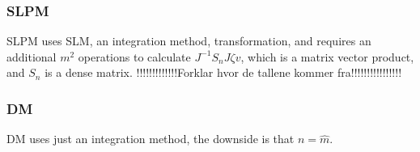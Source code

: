 \subsubsection{SLPM} \label{sec:SLPMcc}
SLPM uses SLM, an integration method, transformation, and requires an additional $m^2$ operations to calculate $ J^{-1} S_n J \zeta v $, which is a matrix vector product, and $S_n$ is a dense matrix.
!!!!!!!!!!!!!Forklar hvor de tallene kommer fra!!!!!!!!!!!!!!!!\\

\subsubsection{DM} \label{sec:DMcc}
DM uses just an integration method, the downside is that $n = \hat{m}$.







 
